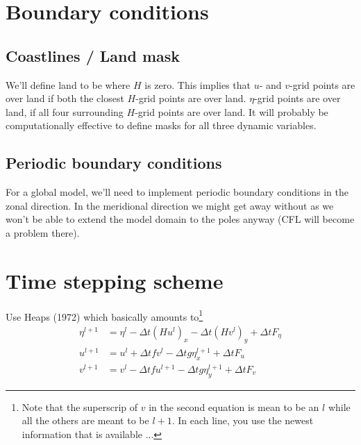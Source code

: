 \documentclass[a4paper]{article}
\begin{document}

\section{Boundary conditions}


\subsection{Coastlines / Land mask}

We'll define land to be where $H$ is zero. This implies that $u$- and $v$-grid
points are over land if both the closest $H$-grid points are over land.
$\eta$-grid points are over land, if all four surrounding $H$-grid points are over land.
It will probably be computationally effective to define masks for all three dynamic variables.


\subsection{Periodic boundary conditions}

For a global model, we'll need to implement periodic boundary conditions in the zonal
direction.  In the meridional direction we might get away without as we won't be able 
to extend the model domain to the poles anyway (CFL will become a problem there).


\section{Time stepping scheme}

Use Heaps (1972) which basically amounts to\footnote{Note that the superscrip
of $v$ in the second equation is mean to be an $l$ while all the others are meant
to be $l+1$. In each line, you use the newest information that is available ...}
\begin{align}
  \eta^{l+1} & = \eta^l - \Delta t (Hu^l)_x - \Delta t (Hv^l)_y + \Delta t F_\eta\\
  u^{l+1} & = u^l + \Delta t f v^l - \Delta t g \eta^{l+1}_x + \Delta t F_u\\
  v^{l+1} & = v^l - \Delta t f u^{l+1} - \Delta t g \eta^{l+1}_y + \Delta t F_v
\end{align}
\end{document}
